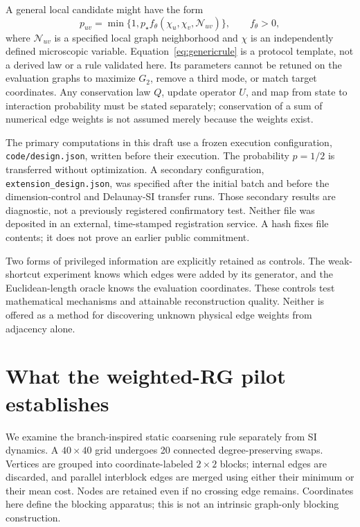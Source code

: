 \documentclass[11pt,letterpaper]{article}
\theoremstyle{definition}
\theoremstyle{remark}
\begin{document}
A general local candidate might have the form
\begin{equation}
 p_{uv}=\min\{1,p_\star f_\theta(\chi_u,\chi_v,\mathcal N_{uv})\},
 \qquad f_\theta>0,
 \label{eq:genericrule}
\end{equation}
where $\mathcal N_{uv}$ is a specified local graph neighborhood and $\chi$ is an independently defined microscopic variable. Equation~\eqref{eq:genericrule} is a protocol template, not a derived law or a rule validated here. Its parameters cannot be retuned on the evaluation graphs to maximize $G_2$, remove a third mode, or match target coordinates. Any conservation law $Q$, update operator $U$, and map from state to interaction probability must be stated separately; conservation of a sum of numerical edge weights is not assumed merely because the weights exist.

The primary computations in this draft use a frozen execution configuration, \texttt{code/design.json}, written before their execution. The probability $p=1/2$ is transferred without optimization. A secondary configuration, \texttt{extension\_design.json}, was specified after the initial batch and before the dimension-control and Delaunay-SI transfer runs. Those secondary results are diagnostic, not a previously registered confirmatory test. Neither file was deposited in an external, time-stamped registration service. A hash fixes file contents; it does not prove an earlier public commitment.

Two forms of privileged information are explicitly retained as controls. The weak-shortcut experiment knows which edges were added by its generator, and the Euclidean-length oracle knows the evaluation coordinates. These controls test mathematical mechanisms and attainable reconstruction quality. Neither is offered as a method for discovering unknown physical edge weights from adjacency alone.

\section{What the weighted-RG pilot establishes}\label{sec:rg}
We examine the branch-inspired static coarsening rule separately from SI dynamics. A $40\times40$ grid undergoes 20 connected degree-preserving swaps. Vertices are grouped into coordinate-labeled $2\times2$ blocks; internal edges are discarded, and parallel interblock edges are merged using either their minimum or their mean cost. Nodes are retained even if no crossing edge remains. Coordinates here define the blocking apparatus; this is not an intrinsic graph-only blocking construction.
\end{document}
